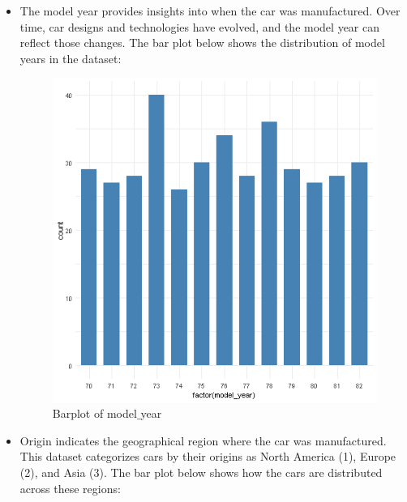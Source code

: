 \begin{itemize}
    \item The model year provides insights into when the car was manufactured. Over time, car designs and technologies have evolved, and the model year can reflect those changes. The bar plot below shows the distribution of model years in the dataset:

\begin{figure}[H]
\centering
\includegraphics[scale=0.4]{img/modelyearbarplot.png}
\caption{Barplot of model$\_$year}
\label{fig:model_year_barplot}
\end{figure}

    \item Origin indicates the geographical region where the car was manufactured. This dataset categorizes cars by their origins as North America (1), Europe (2), and Asia (3). The bar plot below shows how the cars are distributed across these regions:


\end{itemize}
